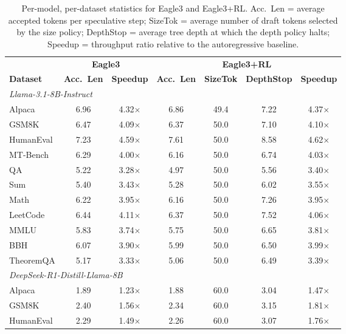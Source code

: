\documentclass[letterpaper,twocolumn,10pt]{article}
\begin{document}
\begin{table}[t]
\centering
\caption{Per-model, per-dataset statistics for Eagle3 and Eagle3+RL.
Acc.~Len = average accepted tokens per speculative step;
SizeTok = average number of draft tokens selected by the size policy;
DepthStop = average tree depth at which the depth policy halts;
Speedup = throughput ratio relative to the autoregressive baseline.}
\label{tab:full_stats}
\scriptsize
\setlength{\tabcolsep}{4pt}
\begin{tabular}{lcccccc}
\toprule
 & \multicolumn{2}{c}{\textbf{Eagle3}} & \multicolumn{4}{c}{\textbf{Eagle3+RL}} \\
\cmidrule(lr){2-3}\cmidrule(lr){4-7}
\textbf{Dataset} & \textbf{Acc.~Len} & \textbf{Speedup}
                 & \textbf{Acc.~Len} & \textbf{SizeTok} & \textbf{DepthStop} & \textbf{Speedup} \\
\midrule
\multicolumn{7}{l}{\textit{Llama-3.1-8B-Instruct}} \\
Alpaca      & 6.96 & 4.32$\times$ & 6.86 & 49.4 & 7.22 & 4.37$\times$ \\
GSM8K       & 6.47 & 4.09$\times$ & 6.37 & 50.0 & 7.10 & 4.10$\times$ \\
HumanEval   & 7.23 & 4.59$\times$ & 7.61 & 50.0 & 8.58 & 4.62$\times$ \\
MT-Bench    & 6.29 & 4.00$\times$ & 6.16 & 50.0 & 6.74 & 4.03$\times$ \\
QA          & 5.22 & 3.28$\times$ & 4.97 & 50.0 & 5.56 & 3.40$\times$ \\
Sum         & 5.40 & 3.43$\times$ & 5.28 & 50.0 & 6.02 & 3.55$\times$ \\
Math        & 6.22 & 3.95$\times$ & 6.16 & 50.0 & 7.26 & 3.95$\times$ \\
LeetCode    & 6.44 & 4.11$\times$ & 6.37 & 50.0 & 7.52 & 4.06$\times$ \\
MMLU        & 5.83 & 3.74$\times$ & 5.75 & 50.0 & 6.65 & 3.81$\times$ \\
BBH         & 6.07 & 3.90$\times$ & 5.99 & 50.0 & 6.50 & 3.99$\times$ \\
TheoremQA   & 5.17 & 3.33$\times$ & 5.06 & 50.0 & 6.49 & 3.39$\times$ \\
\midrule
\multicolumn{7}{l}{\textit{DeepSeek-R1-Distill-Llama-8B}} \\
Alpaca      & 1.89 & 1.23$\times$ & 1.88 & 60.0 & 3.04 & 1.47$\times$ \\
GSM8K       & 2.40 & 1.56$\times$ & 2.34 & 60.0 & 3.15 & 1.81$\times$ \\
HumanEval   & 2.29 & 1.49$\times$ & 2.26 & 60.0 & 3.07 & 1.76$\times$ \\

\end{tabular}
\end{table}
\end{document}
